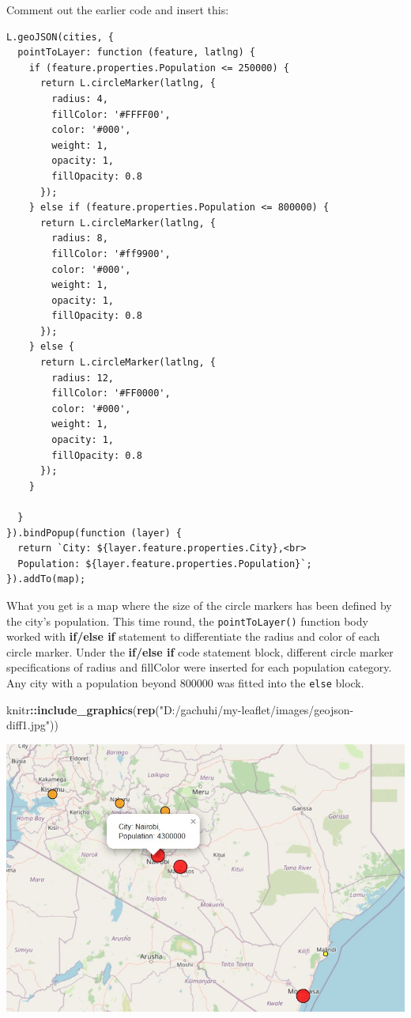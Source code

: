 \documentclass[
]{book}
\newenvironment{Shaded}{\begin{snugshade}}{\end{snugshade}}
\newcommand{\FunctionTok}[1]{\textcolor[rgb]{0.13,0.29,0.53}{\textbf{#1}}}
\newcommand{\NormalTok}[1]{#1}
\newcommand{\SpecialCharTok}[1]{\textcolor[rgb]{0.81,0.36,0.00}{\textbf{#1}}}
\newcommand{\StringTok}[1]{\textcolor[rgb]{0.31,0.60,0.02}{#1}}
\begin{document}
Comment out the earlier code and insert this:

\begin{verbatim}
L.geoJSON(cities, {
  pointToLayer: function (feature, latlng) {
    if (feature.properties.Population <= 250000) {
      return L.circleMarker(latlng, {
        radius: 4,
        fillColor: '#FFFF00',
        color: '#000',
        weight: 1,
        opacity: 1,
        fillOpacity: 0.8  
      });
    } else if (feature.properties.Population <= 800000) {
      return L.circleMarker(latlng, {
        radius: 8,
        fillColor: '#ff9900',
        color: '#000',
        weight: 1,
        opacity: 1,
        fillOpacity: 0.8  
      });
    } else {
      return L.circleMarker(latlng, {
        radius: 12,
        fillColor: '#FF0000',
        color: '#000',
        weight: 1,
        opacity: 1,
        fillOpacity: 0.8  
      });
    }
    
  }
}).bindPopup(function (layer) {
  return `City: ${layer.feature.properties.City},<br>
  Population: ${layer.feature.properties.Population}`;
}).addTo(map);
\end{verbatim}

What you get is a map where the size of the circle markers has been defined by the city's population. This time round, the \texttt{pointToLayer()} function body worked with \textbf{if/else if} statement to differentiate the radius and color of each circle marker. Under the \textbf{if/else if} code statement block, different circle marker specifications of radius and fillColor were inserted for each population category. Any city with a population beyond 800000 was fitted into the \texttt{else} block.

\begin{Shaded}
\begin{Highlighting}[]
\NormalTok{knitr}\SpecialCharTok{::}\FunctionTok{include\_graphics}\NormalTok{(}\FunctionTok{rep}\NormalTok{(}\StringTok{"D:/gachuhi/my{-}leaflet/images/geojson{-}diff1.jpg"}\NormalTok{))}
\end{Highlighting}
\end{Shaded}

\includegraphics{../images/geojson-diff1.jpg}
\end{document}
